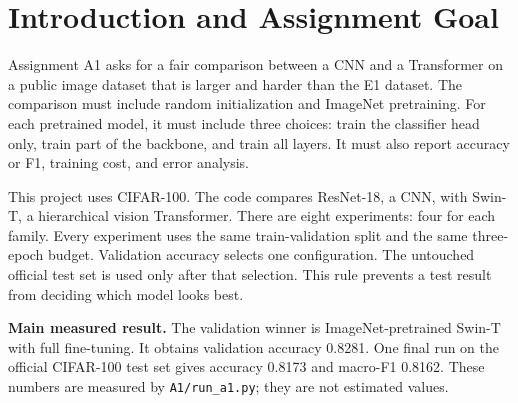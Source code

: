 \documentclass[oneside]{hcmut-report}
\begin{document}
\section*{Introduction and Assignment Goal}
Assignment A1 asks for a fair comparison between a CNN and a Transformer on a public image dataset that is larger and harder than the E1 dataset. The comparison must include random initialization and ImageNet pretraining. For each pretrained model, it must include three choices: train the classifier head only, train part of the backbone, and train all layers. It must also report accuracy or F1, training cost, and error analysis.

This project uses CIFAR-100. The code compares ResNet-18, a CNN, with Swin-T, a hierarchical vision Transformer. There are eight experiments: four for each family. Every experiment uses the same train-validation split and the same three-epoch budget. Validation accuracy selects one configuration. The untouched official test set is used only after that selection. This rule prevents a test result from deciding which model looks best.

\begin{importantbox}
\textbf{Main measured result.} The validation winner is ImageNet-pretrained Swin-T with full fine-tuning. It obtains validation accuracy 0.8281. One final run on the official CIFAR-100 test set gives accuracy 0.8173 and macro-F1 0.8162. These numbers are measured by \texttt{A1/run\_a1.py}; they are not estimated values.
\end{importantbox}

\clearpage
\end{document}
